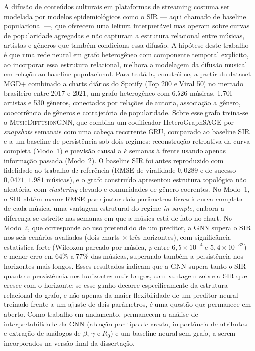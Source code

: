 \begin{resumo}

A difusão de conteúdos culturais em plataformas de streaming costuma ser modelada por modelos epidemiológicos como o SIR — aqui chamado de baseline populacional —, que oferecem uma leitura interpretável mas operam sobre curvas de popularidade agregadas e não capturam a estrutura relacional entre músicas, artistas e gêneros que também condiciona essa difusão. A hipótese deste trabalho é que uma rede neural em grafo heterogêneo com componente temporal explícito, ao incorporar essa estrutura relacional, melhora a modelagem da difusão musical em relação ao baseline populacional. Para testá-la, constrói-se, a partir do dataset MGD+ combinado a charts diários do Spotify (Top 200 e Viral 50) no mercado brasileiro entre 2017 e 2021, um grafo heterogêneo com 6.526 músicas, 1.701 artistas e 530 gêneros, conectados por relações de autoria, associação a gênero, coocorrência de gêneros e cotrajetória de popularidade. Sobre esse grafo treina-se o \textsc{MusicDiffusionGNN}, que combina um codificador HeteroGraphSAGE por \emph{snapshots} semanais com uma cabeça recorrente GRU, comparado ao baseline SIR e a um baseline de persistência sob dois regimes: reconstrução retroativa da curva completa (Modo~1) e previsão causal a $k$ semanas à frente usando apenas informação passada (Modo~2). O baseline SIR foi antes reproduzido com fidelidade ao trabalho de referência (RMSE de viralidade $0{,}0289$ e de sucesso $0{,}0471$, $1.981$ músicas), e o grafo construído apresentou estrutura topológica não aleatória, com \textit{clustering} elevado e comunidades de gênero coerentes. No Modo~1, o SIR obtém menor RMSE por ajustar dois parâmetros livres à curva completa de cada música, uma vantagem estrutural do regime \emph{in-sample}, embora a diferença se estreite nas semanas em que a música está de fato no chart. No Modo~2, que corresponde ao uso pretendido de um preditor, a GNN supera o SIR nos seis cenários avaliados (dois charts $\times$ três horizontes), com significância estatística forte (Wilcoxon pareado por música, $p$ entre $6{,}5\times10^{-4}$ e $5{,}4\times10^{-32}$) e menor erro em 64\% a 77\% das músicas, superando também a persistência nos horizontes mais longos. Esses resultados indicam que a GNN supera tanto o SIR quanto a persistência nos horizontes mais longos, com vantagem sobre o SIR que cresce com o horizonte; se esse ganho decorre especificamente da estrutura relacional do grafo, e não apenas da maior flexibilidade de um preditor neural treinado frente a um ajuste de dois parâmetros, é uma questão que permanece em aberto. Como trabalho em andamento, permanecem a análise de interpretabilidade da GNN (ablação por tipo de aresta, importância de atributos e extração de análogos de $\beta$, $\gamma$ e $R_0$) e um baseline neural sem grafo, a serem incorporados na versão final da dissertação.

\end{resumo}
